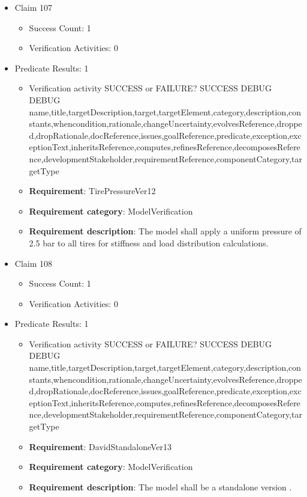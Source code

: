 \documentclass{article}
\begin{document}
\begin{itemize}
  				  \item Claim 107
				\begin{itemize}
			    	\item Success Count: 1 
			    	\item Verification Activities: 0
				\end{itemize}
				
									    
				\item Predicate Results: 1
					\begin{itemize}				
					\item Verification activity SUCCESS or FAILURE? SUCCESS
					DEBUG DEBUG name,title,targetDescription,target,targetElement,category,description,constants,whencondition,rationale,changeUncertainty,evolvesReference,dropped,dropRationale,docReference,issues,goalReference,predicate,exception,exceptionText,inheritsReference,computes,refinesReference,decomposesReference,developmentStakeholder,requirementReference,componentCategory,targetType
					\item \textbf{Requirement}: TirePressureVer12 
					\item \textbf{Requirement category}: ModelVerification
					\item \textbf{Requirement description}: The model shall apply a uniform pressure of 2.5 bar to all tires for stiffness and load distribution calculations.
					\end{itemize}

  				  \item Claim 108
				\begin{itemize}
			    	\item Success Count: 1 
			    	\item Verification Activities: 0
				\end{itemize}
				
									    
				\item Predicate Results: 1
					\begin{itemize}				
					\item Verification activity SUCCESS or FAILURE? SUCCESS
					DEBUG DEBUG name,title,targetDescription,target,targetElement,category,description,constants,whencondition,rationale,changeUncertainty,evolvesReference,dropped,dropRationale,docReference,issues,goalReference,predicate,exception,exceptionText,inheritsReference,computes,refinesReference,decomposesReference,developmentStakeholder,requirementReference,componentCategory,targetType
					\item \textbf{Requirement}: DavidStandaloneVer13 
					\item \textbf{Requirement category}: ModelVerification
					\item \textbf{Requirement description}: The model shall be a standalone version .
					\end{itemize}


\end{itemize}
\end{document}
